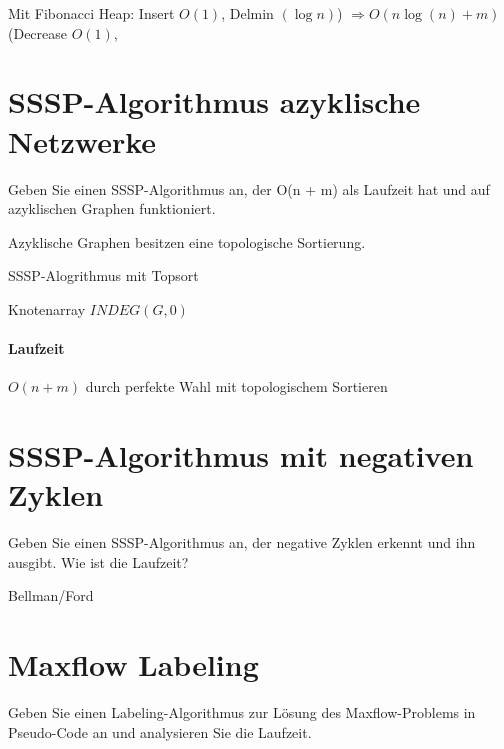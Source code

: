 Mit Fibonacci Heap: Insert $O(1)$, Delmin $(\log n)$) $ \Rightarrow O(n \log(n) + m)$ (Decrease $O(1)$, 

\section{SSSP-Algorithmus azyklische Netzwerke}
Geben Sie einen SSSP-Algorithmus an, der O(n + m) als Laufzeit hat und auf azyklischen Graphen funktioniert.
\par
Azyklische Graphen besitzen eine topologische Sortierung.

\begin{algorithm}
 \caption{SSSP-Alogrithmus mit Topsort}
 Knotenarray $INDEG(G,0)$ \\
 
\end{algorithm}

\paragraph{Laufzeit} $O(n+m)$ durch perfekte Wahl mit topologischem Sortieren





\section{SSSP-Algorithmus mit negativen Zyklen}
\label{sec-2}
Geben Sie einen SSSP-Algorithmus an, der negative Zyklen erkennt und ihn ausgibt.
Wie ist die Laufzeit?
\par
Bellman/Ford








\section{Maxflow Labeling}
\label{sec-3}
Geben Sie einen Labeling-Algorithmus zur Lösung des Maxflow-Problems in Pseudo-Code an und analysieren Sie die Laufzeit.
\par












